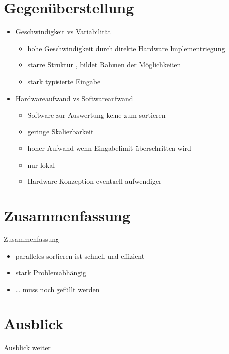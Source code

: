 \documentclass[ucs,9pt]{beamer}
\begin{document}
\section{Gegenüberstellung}
\begin{frame}
    \begin{itemize}
        \item Geschwindigkeit vs Variabilität
        \begin{itemize}
            \item hohe Geschwindigkeit durch direkte Hardware Implementriegung
            \item starre Struktur , bildet Rahmen der Möglichkeiten
            \item stark typisierte Eingabe
        \end{itemize}
    \item Hardwareaufwand vs Softwareaufwand
        \begin{itemize}
            \item Software zur Auswertung keine zum sortieren
            \item geringe Skalierbarkeit
            \item hoher Aufwand wenn Eingabelimit überschritten wird
            \item nur lokal
            \item Hardware Konzeption eventuell aufwendiger
        \end{itemize}
    \end{itemize}
\end{frame}

\section{Zusammenfassung}
\begin{frame}{Zusammenfassung}
\begin{itemize}
  \item paralleles sortieren ist schnell und effizient 
  \item stark Problemabhängig
  \item … {\color{red} muss noch gefüllt werden}
\end{itemize}
\end{frame}

\section{Ausblick}
\begin{frame}{Ausblick}
weiter
\end{frame}
\end{document}
